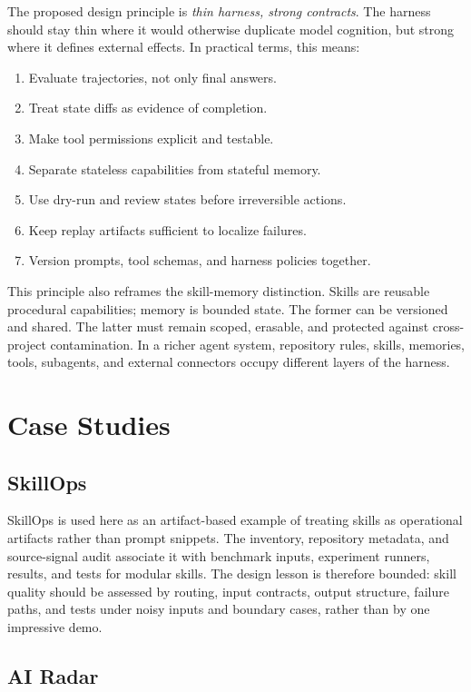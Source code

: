 \documentclass[11pt]{article}
\begin{document}
The proposed design principle is \emph{thin harness, strong contracts}. The harness should stay thin where it would otherwise duplicate model cognition, but strong where it defines external effects. In practical terms, this means:

\begin{enumerate}[leftmargin=*]
  \item Evaluate trajectories, not only final answers.
  \item Treat state diffs as evidence of completion.
  \item Make tool permissions explicit and testable.
  \item Separate stateless capabilities from stateful memory.
  \item Use dry-run and review states before irreversible actions.
  \item Keep replay artifacts sufficient to localize failures.
  \item Version prompts, tool schemas, and harness policies together.
\end{enumerate}

This principle also reframes the skill-memory distinction. Skills are reusable procedural capabilities; memory is bounded state. The former can be versioned and shared. The latter must remain scoped, erasable, and protected against cross-project contamination. In a richer agent system, repository rules, skills, memories, tools, subagents, and external connectors occupy different layers of the harness.

\section{Case Studies}

\subsection{SkillOps}

SkillOps is used here as an artifact-based example of treating skills as operational artifacts rather than prompt snippets. The inventory, repository metadata, and source-signal audit associate it with benchmark inputs, experiment runners, results, and tests for modular skills. The design lesson is therefore bounded: skill quality should be assessed by routing, input contracts, output structure, failure paths, and tests under noisy inputs and boundary cases, rather than by one impressive demo.

\subsection{AI Radar}
\end{document}
